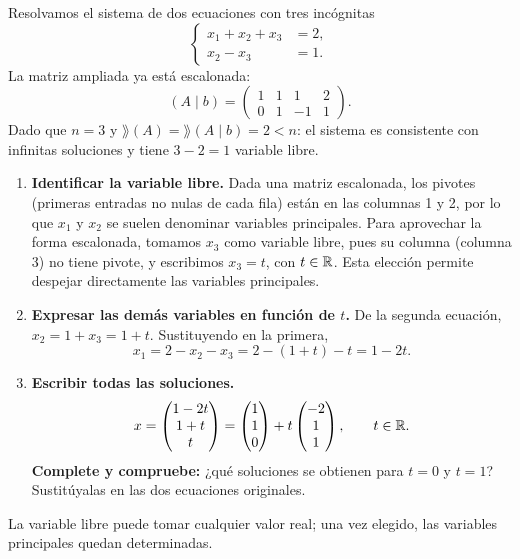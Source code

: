 \documentclass[compacto,10pt]{pubciencias-notas}
\begin{document}
\begin{ejem}
Resolvamos el sistema de dos ecuaciones con tres incógnitas
\[
    \left\{\begin{aligned}
        x_1+x_2+x_3&=2,\\
        x_2-x_3&=1.
    \end{aligned}\right.
\]
La matriz ampliada ya está escalonada:
\[
    (A\mid b)=\left(\begin{array}{ccc|c}
        1&1&1&2\\0&1&-1&1
    \end{array}\right).
\]
Dado que $n=3$ y $\rang(A)=\rang(A\mid b)=2<n$: el sistema es consistente
con infinitas soluciones y tiene $3-2=1$ variable libre.
\begin{enumerate}[label=\textbf{\arabic*)}]
\item \textbf{Identificar la variable libre.} Dada una matriz escalonada,
los pivotes (primeras entradas no nulas de cada fila) están en las columnas 1 y 2, por lo que $x_1$ y $x_2$
se suelen denominar variables principales. Para aprovechar la forma escalonada, tomamos
$x_3$ como variable libre, pues su columna (columna 3) no tiene pivote, y escribimos
$x_3=t$, con $t\in\mathbb{R}$. Esta elección permite despejar directamente las
variables principales.
\item \textbf{Expresar las demás variables en función de $t$.}
De la segunda ecuación, $x_2=1+x_3=1+t$. Sustituyendo en la primera,
\[
    x_1=2-x_2-x_3=2-(1+t)-t=1-2t.
\]
\item \textbf{Escribir todas las soluciones.}
\[
    x=\begin{pmatrix}1-2t\\1+t\\t\end{pmatrix}
     =\begin{pmatrix}1\\1\\0\end{pmatrix}
      +t\begin{pmatrix}-2\\1\\1\end{pmatrix},\qquad t\in\mathbb{R}.
\]
\textbf{Complete y compruebe:} ¿qué soluciones se obtienen para $t=0$
y $t=1$? Sustitúyalas en las dos ecuaciones originales.
\end{enumerate}
La variable libre puede tomar cualquier valor real; una vez elegido,
las variables principales quedan determinadas.
\end{ejem}
\end{document}
